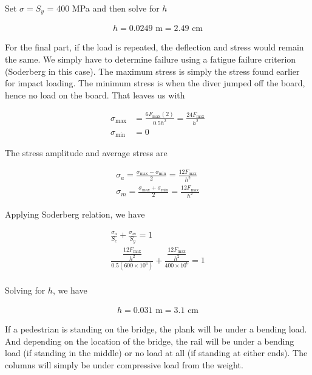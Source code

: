 \documentclass[
10pt,
a4paper,
openany,
svgnames,
]{book}
\begin{document}
\begin{exercises}
  Set $\sigma = S_y$ = 400 MPa and then solve for $h$

  \begin{align*}
    h = 0.0249 \text{ m} = 2.49 \text{ cm}
  \end{align*}

  For the final part, if the load is repeated, the deflection and stress would remain the same. We simply have to determine failure using a fatigue failure criterion (Soderberg in this case). The maximum stress is simply the stress found earlier for impact loading. The minimum stress is when the diver jumped off the board, hence no load on the board. That leaves us with

  \begin{align*}
    \sigma_{\max} &= \frac{6F_{\max}(2)}{0.5h^2} = \frac{24F_{\max}}{h^2} \\
    \sigma_{\min} &= 0
  \end{align*}

  The stress amplitude and average stress are  

  \begin{align*}
    \sigma_a = \frac{\sigma_{\max} - \sigma_{\min}}{2} = \frac{12F_{\max}}{h^2} \\
    \sigma_m = \frac{\sigma_{\max} + \sigma_{\min}}{2} = \frac{12F_{\max}}{h^2}
  \end{align*}

  Applying Soderberg relation, we have

  \begin{align*}
    \frac{\sigma_a}{S_e} + \frac{\sigma_m}{S_y} = 1 \\
    \frac{\dfrac{12F_{\max}}{h^2}}{0.5(600 \times 10^6)} + \frac{\dfrac{12F_{\max}}{h^2}}{400 \times 10^6} = 1 \\
  \end{align*}

  Solving for $h$, we have 

  \begin{align*}
    h = 0.031 \text{ m} = 3.1 \text{ cm}
  \end{align*}

\item  

  If a pedestrian is standing on the bridge, the plank will be under a bending load. And depending on the location of the bridge, the rail will be under a bending load (if standing in the middle) or no load at all (if standing at either ends). The columns will simply be under compressive load from the weight.


\end{exercises}
\end{document}
